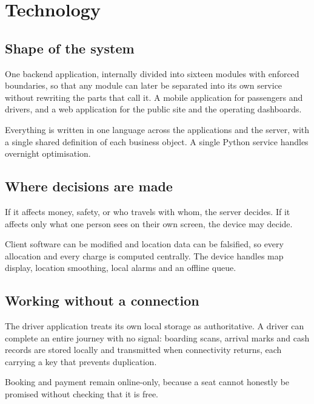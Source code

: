 \chapter{Technology}

\section{Shape of the system}

One backend application, internally divided into sixteen modules with enforced boundaries, so that
any module can later be separated into its own service without rewriting the parts that call it. A
mobile application for passengers and drivers, and a web application for the public site and the
operating dashboards.

Everything is written in one language across the applications and the server, with a single shared
definition of each business object. A single Python service handles overnight optimisation.

\section{Where decisions are made}

\begin{keybox}
If it affects money, safety, or who travels with whom, the server decides. If it affects only what
one person sees on their own screen, the device may decide.
\end{keybox}

Client software can be modified and location data can be falsified, so every allocation and every
charge is computed centrally. The device handles map display, location smoothing, local alarms and
an offline queue.

\section{Working without a connection}

The driver application treats its own local storage as authoritative. A driver can complete an
entire journey with no signal: boarding scans, arrival marks and cash records are stored locally and
transmitted when connectivity returns, each carrying a key that prevents duplication.

Booking and payment remain online-only, because a seat cannot honestly be promised without checking
that it is free.

